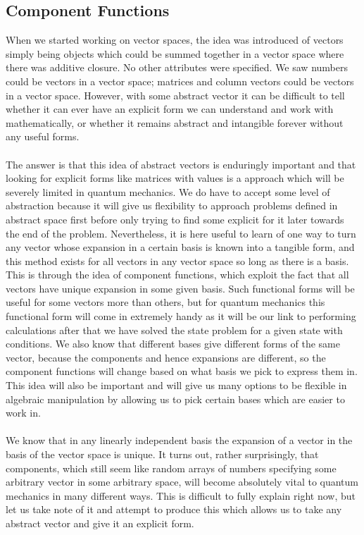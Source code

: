 \subsection{Component Functions}
When we started working on vector spaces, the idea was introduced of vectors simply being objects which could be summed together in a vector space where there was additive closure. No other attributes were specified. We saw numbers could be vectors in a vector space; matrices and column vectors could be vectors in a vector space. However, with some abstract vector it can be difficult to tell whether it can ever have an explicit form we can understand and work with mathematically, or whether it remains abstract and intangible forever without any useful forms.
\\\\
The answer is that this idea of abstract vectors is enduringly important and that looking for explicit forms like matrices with values is a approach which will be severely limited in quantum mechanics. We do have to accept some level of abstraction because it will give us flexibility to approach problems defined in abstract space first before only trying to find some explicit for it later towards the end of the problem. Nevertheless, it is here useful to learn of one way to turn any vector whose expansion in a certain basis is known into a tangible form, and this method exists for all vectors in any vector space so long as there is a basis. This is through the idea of component functions, which exploit the fact that all vectors have unique expansion in some given basis. Such functional forms will be useful for some vectors more than others, but for quantum mechanics this functional form will come in extremely handy as it will be our link to performing calculations after that we have solved the state problem for a given state with conditions. We also know that different bases give different forms of the same vector, because the components and hence expansions are different, so the component functions will change based on what basis we pick to express them in. This idea will also be important and will give us many options to be flexible in algebraic manipulation by allowing us to pick certain bases which are easier to work in.
\\\\
We know that in any linearly independent basis the expansion of a vector in the basis of the vector space is unique. It turns out, rather surprisingly, that components, which still seem like random arrays of numbers specifying some arbitrary vector in some arbitrary space, will become absolutely vital to quantum mechanics in many different ways. This is difficult to fully explain right now, but let us take note of it and attempt to produce this  which allows us to take any abstract vector and give it an explicit form.
